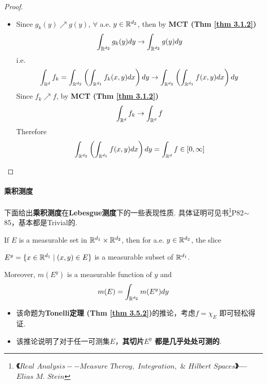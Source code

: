 \begin{thm}
\begin{proof}
\begin{itemize}
				\vspace{3em}
				
				\item Since $g_{k}(y) \nearrow g(y)$, $\forall$ a.e. $y \in \mathbb{R}^{d_2}$, then by \textbf{MCT (Thm \ref{thm 3.1.2})}
				\begin{align}
					\int_{\mathbb{R}^{d_2}}{g_{k}(y) dy} \to \int_{\mathbb{R}^{d_2}}{g(y) dy}
				\end{align}
				i.e.
				\begin{align}
					\int_{\mathbb{R}^d}{f_k} 
					= \int_{\mathbb{R}^{d_2}}{\left( \int_{\mathbb{R}^{d_1}}{f_{k}(x , y) dx} \right) dy}
					\to \int_{\mathbb{R}^{d_2}}{\left( \int_{\mathbb{R}^{d_1}}{f(x , y) dx} \right) dy}
				\end{align}
				Since $f_k \nearrow f$, by \textbf{MCT (Thm \ref{thm 3.1.2})}
				\begin{align}
					\int_{\mathbb{R}^d}{f_k} \to \int_{\mathbb{R}^d}{f}
				\end{align}
				Therefore
				\begin{align}
					\int_{\mathbb{R}^{d_2}}{\left( \int_{\mathbb{R}^{d_1}}{f(x , y) dx} \right) dy} = \int_{\mathbb{R}^d}{f} \in [0 , \infty]
				\end{align}
			\end{itemize}
		\end{proof}
	\end{thm}

\newpage
\paragraph{乘积测度}
	下面给出\textbf{乘积测度}在\textbf{Lebesgue测度}下的一些表现性质. 具体证明可见书\footnote{\textbf{《$Real \,\, Analysis -- Measure \,\, Theroy, \,\, Integration, \,\, \& \,\, Hilbert \,\, Spaces$》--- $Elias \,\, M. \,\, Stein$}}P82$\sim$ 85，基本都是Trivial的.
	\begin{corollary}\label{cor 3.5.3}
		If $E$ is a measurable set in $\mathbb{R}^{d_1} \times \mathbb{R}^{d_2}$, then for a.e. $y \in \mathbb{R}^{d_2}$, the slice
		\begin{center}
			$E^y = \{ x \in \mathbb{R}^{d_1} \mid (x , y) \in E \}$ is a measurable subset of $\mathbb{R}^{d_1}$.
		\end{center}
		Moreover, $m(E^y)$ is a measurable function of $y$ and
		\begin{align}
			m(E) = \int_{\mathbb{R}^{d_2}}{m(E^y) dy}
		\end{align}
	
		\vspace{1em}
		\begin{rmk}
			\begin{itemize}
				\item 该命题为\textbf{Tonelli定理 (Thm \ref{thm 3.5.2})}的推论，考虑$f = \chi_E$ 即可轻松得证.
				
				\item 该推论说明了对于任一可测集$E$，\textbf{其切片$E^y$ 都是几乎处处可测的}.
			\end{itemize}
		\end{rmk}
	\end{corollary}

